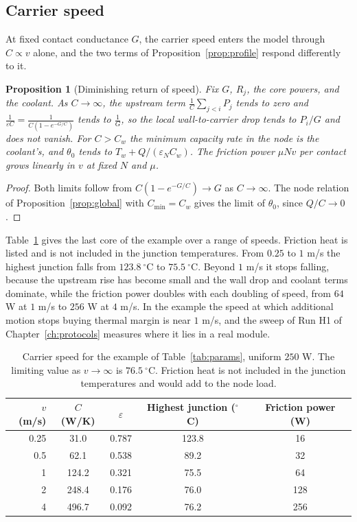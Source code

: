 \documentclass[11pt,openany]{book}
\theoremstyle{plain}
\newtheorem{proposition}[theorem]{Proposition}
\theoremstyle{definition}
\theoremstyle{remark}
\begin{document}
\subsection{Carrier speed}
\label{sec:speed}

At fixed contact conductance $G$, the carrier speed enters the model through $C\propto v$ alone, and the two terms of Proposition~\ref{prop:profile} respond differently to it.

\begin{proposition}[Diminishing return of speed]\label{prop:speed}
Fix $G$, $R_j$, the core powers, and the coolant. As $C\to\infty$, the upstream term $\frac1C\sum_{j<i}P_j$ tends to zero and $\frac{1}{\varepsilon C}=\frac{1}{C(1-e^{-G/C})}$ tends to $\frac1G$, so the local wall-to-carrier drop tends to $P_i/G$ and does not vanish. For $C>C_w$ the minimum capacity rate in the node is the coolant's, and $\theta_0$ tends to $T_w+Q/(\varepsilon_N C_w)$. The friction power $\mu N v$ per contact grows linearly in $v$ at fixed $N$ and $\mu$.
\end{proposition}
\begin{proof}
Both limits follow from $C(1-e^{-G/C})\to G$ as $C\to\infty$. The node relation of Proposition~\ref{prop:global} with $C_{\min}=C_w$ gives the limit of $\theta_0$, since $Q/C\to0$.
\end{proof}

Table~\ref{tab:speed} gives the last core of the example over a range of speeds. Friction heat is listed and is not included in the junction temperatures. From $0.25$ to $1$ m/s the highest junction falls from $123.8\ ^\circ$C to $75.5\ ^\circ$C. Beyond $1$ m/s it stops falling, because the upstream rise has become small and the wall drop and coolant terms dominate, while the friction power doubles with each doubling of speed, from $64$ W at $1$ m/s to $256$ W at $4$ m/s. In the example the speed at which additional motion stops buying thermal margin is near $1$ m/s, and the sweep of Run H1 of Chapter~\ref{ch:protocols} measures where it lies in a real module.

\begin{table}[t]
\centering
\small
\begin{tabular}{@{}rcccc@{}}
\toprule
$v$ (m/s) & $C$ (W/K) & $\varepsilon$ & Highest junction ($^\circ$C) & Friction power (W) \\
\midrule
0.25 & 31.0 & 0.787 & 123.8 & 16 \\
0.5 & 62.1 & 0.538 & 89.2 & 32 \\
1 & 124.2 & 0.321 & 75.5 & 64 \\
2 & 248.4 & 0.176 & 76.0 & 128 \\
4 & 496.7 & 0.092 & 76.2 & 256 \\
\bottomrule
\end{tabular}
\caption{Carrier speed for the example of Table~\ref{tab:params}, uniform $250$ W. The limiting value as $v\to\infty$ is $76.5\ ^\circ$C. Friction heat is not included in the junction temperatures and would add to the node load.}
\label{tab:speed}
\end{table}
\end{document}
